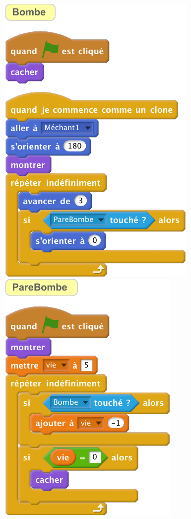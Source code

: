 \documentclass[class=report,crop=false, 12pt]{standalone}
\begin{document}
\begin{code}
{\includegraphics[scale=\scalesolution,scale=0.9]{code-10-ex3b}
\includegraphics[scale=\scalesolution,scale=0.9]{code-10-ex3c}
}    
\end{code}
\fi
\end{document}

